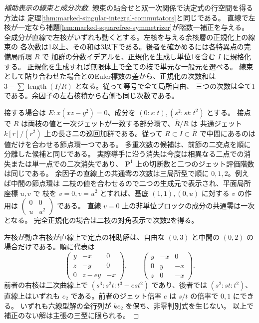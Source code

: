 \begin{proof}[補助表示の線束と成分次数]
線束の貼合せと双一次関係で決定式の行空間を得る方法は
定理\ref{thm:marked-singular-integral-commutators}と同じである。
直線で左核が一定なら補題\ref{lem:marked-squarefree-symmetrizer}が階数一補正を与える。
全成分が直線で左核がいずれも動くとする。左核を与える余核層の正規化上の線束の
各次数は1以上、その和は3以下である。後者を確かめるには各特異点の完備局所環 $R$ で
加群の分数イデアルを、正規化を生成し単位1を含む $I$ に規格化する。
正規化を生成すれば無限体上で全ての枝で単元な一般元を選べる。
線束として貼り合わせた場合とのEuler標数の差から、正規化の次数和は
$3-\sum\operatorname{length}(I/R)$ となる。従って等号で全て局所自由、
三つの次数は全て1である。余因子の左右核積から右側も同じ次数である。

接する場合は $E:x(xz-y^2)=0$、成分を $(0:s:t),(s^2:st:t^2)$ とする。
接点で $R$ は両枝の値と一次ジェットが一致する部分環で、$\bar R/R$ は
共通ジェット $k[r]/(r^2)$ 上の長さ二の巡回加群である。従って $R\subset I\subset\bar R$
で中間にあるのは値だけを合わせる節点環一つである。
多重次数の候補は、前節の二交点を順に分離した候補と同じである。
実際導手に沿う消失は今度は相異なる二点での消失または単一点での二次消失であり、
$\mathbf P^1$ 上の切断数と二つのジェット評価階数は同じである。
余因子の直線上の共通零の次数は三局所型で順に $0,1,2$。例えば中間の節点環は
二枝の値を合わせるので二つの生成元で表示され、平面局所座標 $u,v$ で
枝を $v=0,v=u^2$ とすれば、基底 $(1,1),(0,u)$ に対する $v$ の作用は
$\left(\begin{smallmatrix}0&0\\u&u^2\end{smallmatrix}\right)$ である。
直線 $v=0$ 上の非単位ブロックの成分の共通零は一次となる。
完全正規化の場合は二枝の対角表示で次数2を得る。

左核が動き右核が直線上で定点の補助解は、自由な $(0,3)$ と中間の $(0,2)$
の場合だけである。順に代表は
\[
 \begin{pmatrix}y&-x&0\\z&-y&0\\0&z-e y&-x\end{pmatrix},\qquad
 \begin{pmatrix}y&-x&0\\0&y&-x\\z&0&-x\end{pmatrix}.
\]
前者の右核は二次曲線上で $(s^3:s^2t:t^3-e st^2)$ であり、後者では $(s^2:st:t^2)$、
直線上はいずれも $e_2$ である。前者のジェット倍率 $e$ は $s/t$ の倍率で $0,1$ にできる。
いずれも六線型解の全行列が $ke_2$ を保ち、非零判別式を生じない。
以上で補正のない解は主張の三型に限られる。
\end{proof}

